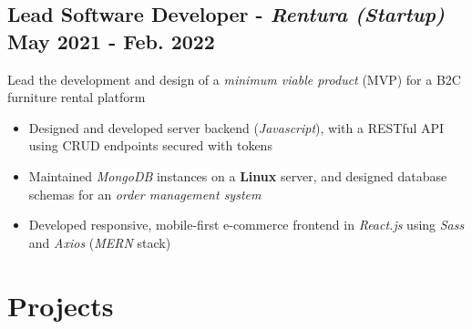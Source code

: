 \documentclass[9pt]{article}
\begin{document}
\subsection{Lead Software Developer - \textit{Rentura (Startup)} \hfill \normalsize\textnormal{May 2021 - Feb. 2022}} %
Lead the development and design of a \textit{minimum viable product} (MVP) for a B2C furniture rental platform
\vspace{-0.5em}
\begin{itemize}
	\item Designed and developed server backend (\textit{Javascript}), with a RESTful API using CRUD endpoints secured with tokens
  \item Maintained \textit{MongoDB} instances on a \textbf{Linux} server, and designed database schemas for an \textit{order management system}
  \item Developed responsive, mobile-first e-commerce frontend in \textit{React.js} using \textit{Sass} and \textit{Axios} (\textit{MERN} stack)
\end{itemize}
\vspace{-0.5em}




\section{Projects}
\end{document}
